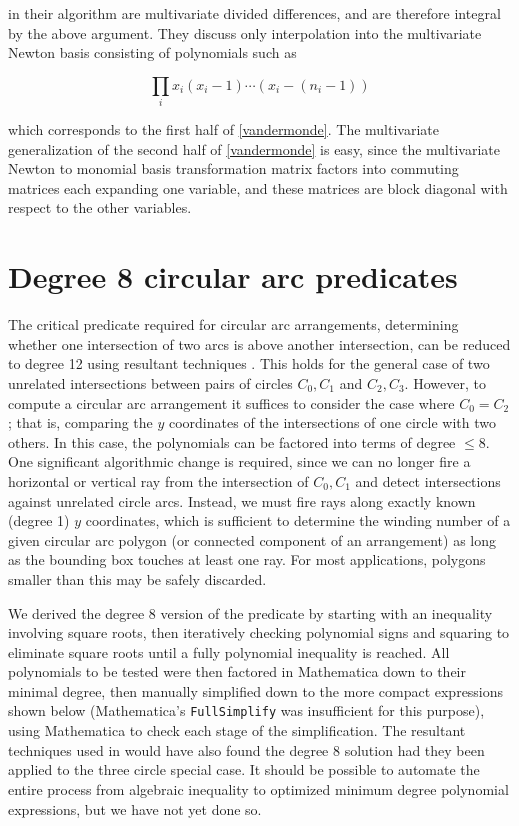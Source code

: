 \documentclass[11pt]{article}
\begin{document}
in their algorithm are multivariate divided differences, and are therefore integral by the above argument.  They discuss only interpolation into the multivariate Newton basis
consisting of polynomials such as
\begin{linenomath*}
$$\prod_i x_i(x_i-1)\cdots(x_i-(n_i-1))$$
\end{linenomath*}
which corresponds to the first half of \autoref{vandermonde}.  The multivariate generalization of the second half of \autoref{vandermonde} is easy, since the multivariate Newton to
monomial basis transformation matrix factors into commuting matrices each expanding one variable, and these matrices are block diagonal with respect to the other variables.

\section{Degree 8 circular arc predicates} \label{sec:predicates}

The critical predicate required for circular arc arrangements, determining whether one intersection of two arcs is above another intersection,
can be reduced to degree 12 using resultant techniques \cite{devillers2000algebraic}.  This holds for the general case of two unrelated intersections between pairs of circles
$C_0,C_1$ and $C_2,C_3$.  However, to compute a circular arc arrangement it suffices to consider the case where $C_0 = C_2$; that is, comparing the $y$ coordinates of the
intersections of one circle with two others.  In this case, the polynomials can be factored into terms of degree $\le 8$.  One significant algorithmic change is required,
since we can no longer fire a horizontal or vertical ray from the intersection of $C_0,C_1$ and detect intersections against unrelated circle arcs.  Instead, we must fire
rays along exactly known (degree 1) $y$ coordinates, which is sufficient to determine the winding number of a given circular arc polygon (or connected component of an arrangement)
as long as the bounding box touches at least one ray.  For most applications, polygons smaller than this may be safely discarded.

We derived the degree 8 version of the predicate by starting with an inequality involving square roots, then iteratively checking polynomial signs and squaring to eliminate
square roots until a fully polynomial inequality is reached.  All polynomials to be tested were then factored in Mathematica down to their minimal degree, then manually simplified
down to the more compact expressions shown below (Mathematica's \verb+FullSimplify+ was insufficient for this purpose), using Mathematica to check each stage of the simplification.
The resultant techniques used in \cite{devillers2000algebraic} would have also found the degree 8 solution had they been applied to the three circle special case.  It should be possible
to automate the entire process from algebraic inequality to optimized minimum degree polynomial expressions, but we have not yet done so.
\end{document}
